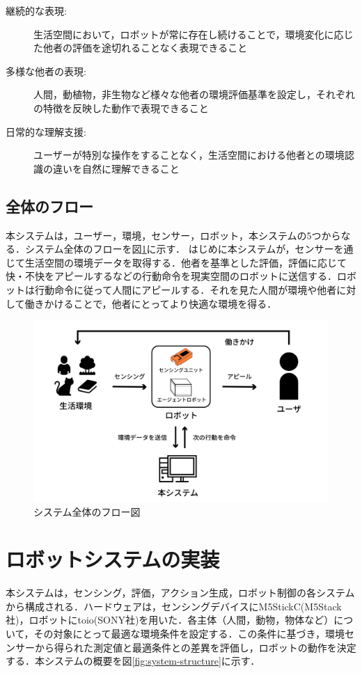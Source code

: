 \documentclass[paper=a4paper,jafontsize=9pt,head_space=15mm,gutter=20mm,
twocolumn,number_of_lines=49, line_length=26zw]{myuarticle}
\begin{document}
\begin{description}
  \item[継続的な表現:] 生活空間において，ロボットが常に存在し続けることで，環境変化に応じた他者の評価を途切れることなく表現できること
  \item[多様な他者の表現:] 人間，動植物，非生物など様々な他者の環境評価基準を設定し，それぞれの特徴を反映した動作で表現できること
  \item[日常的な理解支援:] ユーザーが特別な操作をすることなく，生活空間における他者との環境認識の違いを自然に理解できること
\end{description}

\subsection{全体のフロー}
本システムは，ユーザー，環境，センサー，ロボット，本システムの5つからなる．システム全体のフローを図\ref{fig:system-flow}に示す．
はじめに本システムが，センサーを通じて生活空間の環境データを取得する．他者を基準とした評価，評価に応じて快・不快をアピールするなどの行動命令を現実空間のロボットに送信する．ロボットは行動命令に従って人間にアピールする．それを見た人間が環境や他者に対して働きかけることで，他者にとってより快適な環境を得る．

\begin{figure}[h]
  \centering
    \includegraphics[keepaspectratio,width=0.8\columnwidth]{resources/system_flow.png}
  \caption{システム全体のフロー図}
  \label{fig:system-flow}
\end{figure}

\section{ロボットシステムの実装}
本システムは，センシング，評価，アクション生成，ロボット制御の各システムから構成される．ハードウェアは，センシングデバイスにM5StickC(M5Stack社)，ロボットにtoio(SONY社)を用いた．各主体（人間，動物，物体など）について，その対象にとって最適な環境条件を設定する．この条件に基づき，環境センサーから得られた測定値と最適条件との差異を評価し，ロボットの動作を決定する．本システムの概要を図\ref{fig:system-structure}に示す．
\end{document}
